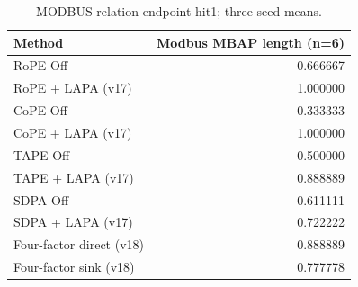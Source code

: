 \begin{table}[t]
\centering
\scriptsize
\caption{MODBUS relation endpoint hit1; three-seed means.}
\begin{tabular}{lr}
\toprule
Method & Modbus MBAP length (n=6) \\
\midrule
RoPE Off & 0.666667 \\
RoPE + LAPA (v17) & 1.000000 \\
CoPE Off & 0.333333 \\
CoPE + LAPA (v17) & 1.000000 \\
TAPE Off & 0.500000 \\
TAPE + LAPA (v17) & 0.888889 \\
SDPA Off & 0.611111 \\
SDPA + LAPA (v17) & 0.722222 \\
Four-factor direct (v18) & 0.888889 \\
Four-factor sink (v18) & 0.777778 \\
\bottomrule
\end{tabular}
\end{table}

